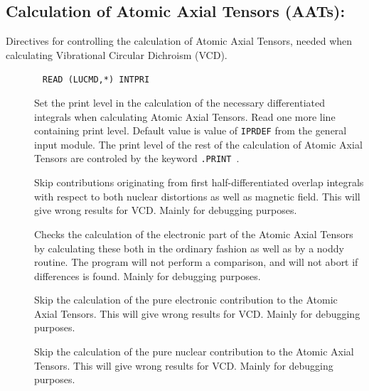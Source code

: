 \subsection{Calculation of Atomic Axial Tensors (AATs):
}\label{sec:aat}  

Directives for controlling the calculation of Atomic Axial
Tensors,
needed when calculating Vibrational Circular Dichroism
(VCD).
\begin{description}

\item[]\verb| |\newline
\verb|READ (LUCMD,*) INTPRI| 

Set the print level in the calculation of the necessary differentiated
integrals when calculating Atomic Axial Tensors. Read one more line
containing print level. Default value is value of \verb|IPRDEF|
from the general input module. The print level of the rest of the
calculation of Atomic Axial Tensors are controled by the keyword
\verb|.PRINT |.

\item[] Skip contributions originating from first
half-differentiated overlap
integrals with respect to both nuclear 
distortions as well as magnetic field. This will give wrong results
for VCD. Mainly for debugging purposes.

\item[] Checks the calculation of the electronic part of
the Atomic Axial Tensors by calculating these both in the ordinary
fashion as well as by a noddy routine. The program will not
perform a comparison, and will not abort if differences is found.
Mainly for debugging purposes.

\item[] Skip the calculation of the pure electronic
contribution to the Atomic Axial Tensors. This will give wrong results
for VCD. Mainly for debugging purposes.

\item[] Skip the calculation of the pure nuclear
contribution to the Atomic Axial Tensors. This will give wrong results
for VCD. Mainly for debugging purposes.


\end{description}
